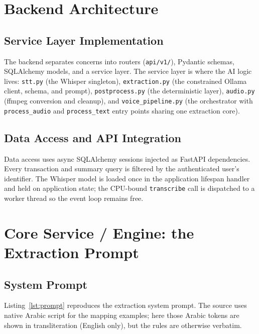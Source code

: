 \section{Backend Architecture}

\subsection{Service Layer Implementation}

The backend separates concerns into routers (\texttt{api/v1/}), Pydantic schemas,
SQLAlchemy models, and a service layer. The service layer is where the AI logic
lives: \texttt{stt.py} (the Whisper singleton), \texttt{extraction.py} (the
constrained Ollama client, schema, and prompt), \texttt{postprocess.py} (the
deterministic layer), \texttt{audio.py} (ffmpeg conversion and cleanup), and
\texttt{voice\_pipeline.py} (the orchestrator with \texttt{process\_audio} and
\texttt{process\_text} entry points sharing one extraction core).

\subsection{Data Access and API Integration}

Data access uses async SQLAlchemy sessions injected as FastAPI dependencies. Every
transaction and summary query is filtered by the authenticated user's identifier.
The Whisper model is loaded once in the application lifespan handler and held on
application state; the CPU-bound \texttt{transcribe} call is dispatched to a worker
thread so the event loop remains free.

\section{Core Service / Engine: the Extraction Prompt}

\subsection{System Prompt}

Listing~\ref{lst:prompt} reproduces the extraction system prompt. The source uses
native Arabic script for the mapping examples; here those Arabic tokens are shown
in transliteration (English only), but the rules are otherwise verbatim.

